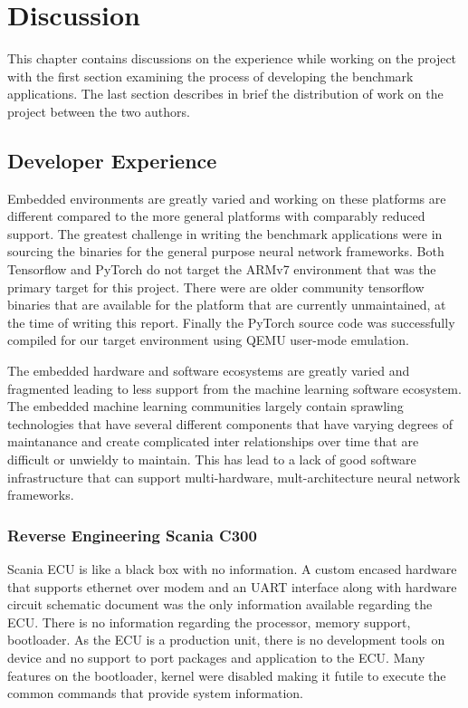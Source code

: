 
\chapter{Discussion}

This chapter contains discussions on the experience while working on the project with the first section examining the process of developing the benchmark applications. The last section describes in brief the distribution of work on the project between the two authors.

\section{Developer Experience}

Embedded environments are greatly varied and working on these platforms are different compared to the more general platforms with comparably reduced support. The greatest challenge in writing the benchmark applications were in sourcing the binaries for the general purpose neural network frameworks. Both Tensorflow and PyTorch do not target the ARMv7 environment that was the primary target for this project. There were are older community tensorflow binaries that are available for the platform that are currently unmaintained, at the time of writing this report. Finally the PyTorch source code was successfully compiled for our target environment using QEMU user-mode emulation.

The embedded hardware and software ecosystems are greatly varied and fragmented leading to less support from the machine learning software ecosystem. The embedded machine learning communities largely contain sprawling technologies that have several different components that have varying degrees of maintanance and create complicated inter relationships over time that are difficult or unwieldy to maintain. This has lead to a lack of good software infrastructure that can support multi-hardware, mult-architecture neural network frameworks.

\subsection{Reverse Engineering Scania C300}

Scania ECU is like a black box with no information. A custom encased hardware that supports ethernet over modem and an UART interface along with hardware circuit schematic document was the only information available regarding the ECU. There is no information regarding the processor,  memory support, bootloader. As the ECU is a production unit, there is no development tools on device and no support to port packages and application to the ECU. Many features on the bootloader, kernel were disabled making it futile to execute the common commands that provide system information.

